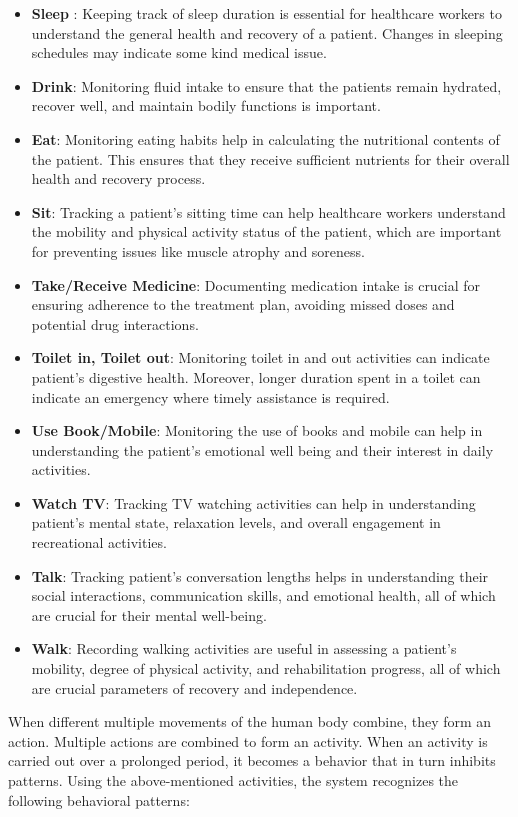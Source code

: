 \begin{itemize}
    \item \textbf{Sleep} : Keeping track of sleep duration is essential for healthcare workers to understand the general health and recovery of a patient. Changes in sleeping schedules may indicate some kind medical issue.
    \item \textbf{Drink}: Monitoring fluid intake to ensure that the patients remain hydrated, recover well, and maintain bodily functions is important.
    \item \textbf{Eat}: Monitoring eating habits help in calculating the nutritional contents of the patient. This ensures that they receive sufficient nutrients for their overall health and recovery process.
    \item \textbf{Sit}: Tracking a patient’s sitting time can help healthcare workers understand the mobility and physical activity status of the patient, which are important for preventing issues like muscle atrophy and soreness.
    \item \textbf{Take/Receive Medicine}: Documenting medication intake is crucial for ensuring adherence to the treatment plan, avoiding missed doses and potential drug interactions.
    \item \textbf{Toilet in, Toilet out}: Monitoring toilet in and out activities can indicate patient's digestive health. Moreover, longer duration spent in a toilet can indicate an emergency where timely assistance is required.  
    \item \textbf{Use Book/Mobile}: Monitoring the use of books and mobile can help in understanding the patient's emotional well being and their interest in daily activities.
    \item \textbf{Watch TV}: Tracking TV watching activities can help in understanding patient's mental state, relaxation levels, and overall engagement in recreational activities.
    \item \textbf{Talk}: Tracking patient's conversation lengths helps in understanding their social interactions, communication skills, and emotional health, all of which are crucial for their mental well-being.
    \item \textbf{Walk}: Recording walking activities are useful in assessing a patient's mobility, degree of physical activity, and rehabilitation progress, all of which are crucial parameters of recovery and independence.\\
\end{itemize}    
When different multiple movements of the human body combine, they form an action. Multiple actions are combined to form an activity. When an activity is carried out over a prolonged period, it becomes a behavior that in turn inhibits patterns. Using the above-mentioned activities, the system recognizes the following behavioral patterns:
